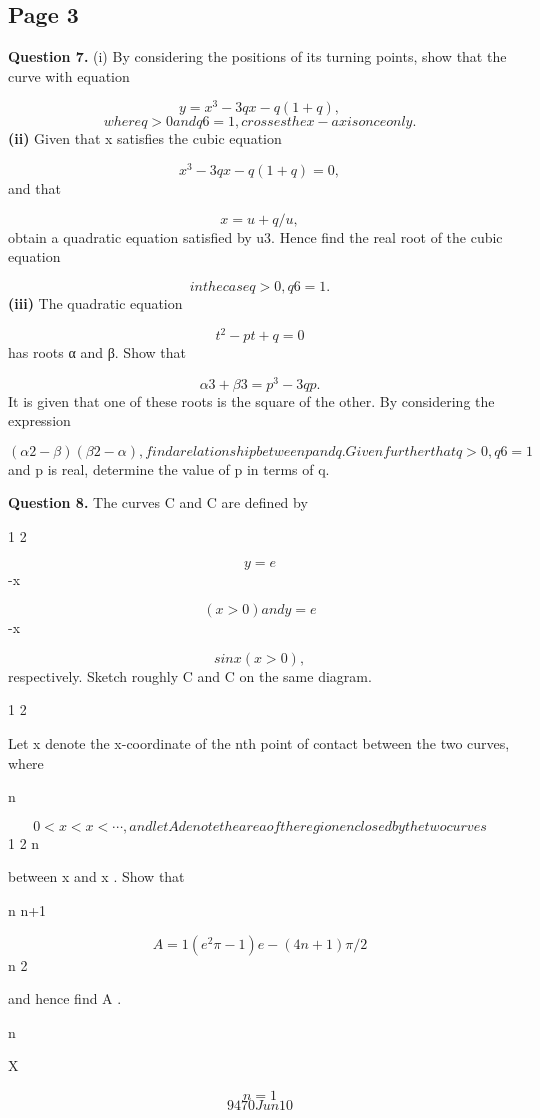 \documentclass[12pt]{article}
\begin{document}
\subsection*{Page 3}
\begin{flushleft}
\bigskip\textbf{Question 7.} (i) By considering the positions of its turning points, show that the curve with equation\par
\[y = x^3 - 3qx - q(1 + q) ,\]
\[where q > 0 and q 6= 1, crosses the x-axis once only.\]
\textbf{(ii)} Given that x satisfies the cubic equation\par
\[x^3 - 3qx - q(1 + q) = 0 ,\]
and that\par
\[x = u + q/u ,\]
obtain a quadratic equation satisfied by u3. Hence find the real root of the cubic equation\par
\[in the case q > 0, q 6= 1.\]
\textbf{(iii)} The quadratic equation\par
\[t^2 - pt + q = 0\]
has roots α and β. Show that\par
\[α3 + β3 = p^3 - 3qp .\]
It is given that one of these roots is the square of the other. By considering the expression\par
\[(α2 - β)(β2 - α), find a relationship between p and q. Given further that q > 0, q 6= 1\]
and p is real, determine the value of p in terms of q.\par
\bigskip\textbf{Question 8.} The curves C and C are defined by\par
1 2\par
\[y = e\]
-x\par
\[(x > 0) and y = e\]
-x\par
\[sin x (x > 0),\]
respectively. Sketch roughly C and C on the same diagram.\par
1 2\par
Let x denote the x-coordinate of the nth point of contact between the two curves, where\par
n\par
\[0 < x < x < \cdots , and let A denote the area of the region enclosed by the two curves\]
1 2 n\par
between x and x . Show that\par
n n+1\par
\[A = 1 (e^2\pi - 1)e -(4n+1)\pi/2\]
n 2\par
\infty\par
and hence find A .\par
n\par
X\par
\[n=1\]
\[9470 Jun10\]
\end{flushleft}
\end{document}
